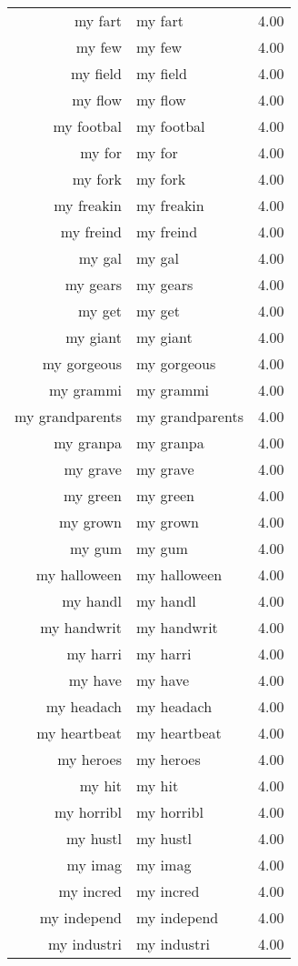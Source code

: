 \begin{table}[ht]
\begin{tabular}{rlr}
  my fart & my fart & 4.00 \\ 
  my few & my few & 4.00 \\ 
  my field & my field & 4.00 \\ 
  my flow & my flow & 4.00 \\ 
  my footbal & my footbal & 4.00 \\ 
  my for & my for & 4.00 \\ 
  my fork & my fork & 4.00 \\ 
  my freakin & my freakin & 4.00 \\ 
  my freind & my freind & 4.00 \\ 
  my gal & my gal & 4.00 \\ 
  my gears & my gears & 4.00 \\ 
  my get & my get & 4.00 \\ 
  my giant & my giant & 4.00 \\ 
  my gorgeous & my gorgeous & 4.00 \\ 
  my grammi & my grammi & 4.00 \\ 
  my grandparents & my grandparents & 4.00 \\ 
  my granpa & my granpa & 4.00 \\ 
  my grave & my grave & 4.00 \\ 
  my green & my green & 4.00 \\ 
  my grown & my grown & 4.00 \\ 
  my gum & my gum & 4.00 \\ 
  my halloween & my halloween & 4.00 \\ 
  my handl & my handl & 4.00 \\ 
  my handwrit & my handwrit & 4.00 \\ 
  my harri & my harri & 4.00 \\ 
  my have & my have & 4.00 \\ 
  my headach & my headach & 4.00 \\ 
  my heartbeat & my heartbeat & 4.00 \\ 
  my heroes & my heroes & 4.00 \\ 
  my hit & my hit & 4.00 \\ 
  my horribl & my horribl & 4.00 \\ 
  my hustl & my hustl & 4.00 \\ 
  my imag & my imag & 4.00 \\ 
  my incred & my incred & 4.00 \\ 
  my independ & my independ & 4.00 \\ 
  my industri & my industri & 4.00 \\ 

\end{tabular}
\end{table}
